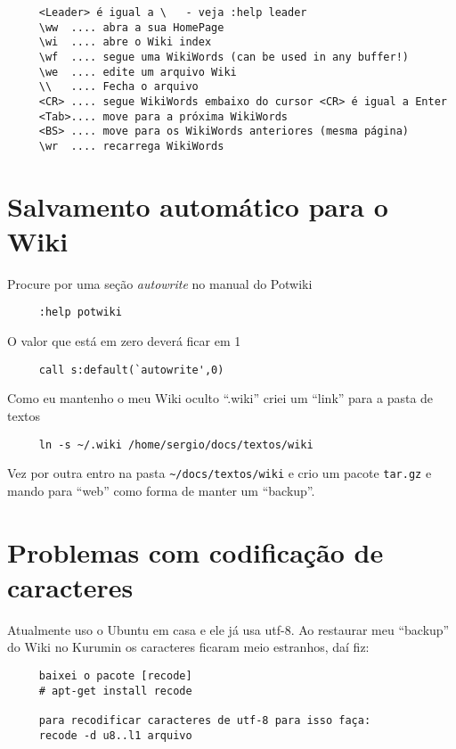 \begin{verbatim}
     <Leader> é igual a \   - veja :help leader
     \ww  .... abra a sua HomePage
     \wi  .... abre o Wiki index
     \wf  .... segue uma WikiWords (can be used in any buffer!)
     \we  .... edite um arquivo Wiki
     \\   .... Fecha o arquivo
     <CR> .... segue WikiWords embaixo do cursor <CR> é igual a Enter
     <Tab>.... move para a próxima WikiWords
     <BS> .... move para os WikiWords anteriores (mesma página)
     \wr  .... recarrega WikiWords
\end{verbatim}

\section{Salvamento automático para o Wiki }
\label{Salvamento automático para o Wiki }
Procure por uma seção {\em autowrite} no manual do Potwiki

\begin{verbatim}
     :help potwiki
\end{verbatim}

O valor que está em zero deverá ficar em 1

\begin{verbatim}
     call s:default(`autowrite',0)
\end{verbatim}

{\Large {}} Como eu mantenho o meu Wiki oculto ``.wiki'' criei um
``link'' para a pasta de textos

\begin{verbatim}
     ln -s ~/.wiki /home/sergio/docs/textos/wiki
\end{verbatim}

Vez por outra entro na pasta \verb|~/docs/textos/wiki| e crio um
pacote {\tt tar.gz} e mando para ``web'' como forma de manter um ``backup''.

\section{Problemas com codificação de caracteres}
\label{Problemas com codificação de caracteres}

Atualmente uso o Ubuntu em casa e ele já usa utf-8. Ao restaurar meu
``backup'' do Wiki no Kurumin os caracteres ficaram meio estranhos,
daí fiz:

\begin{verbatim}
     baixei o pacote [recode]
     # apt-get install recode
     
     para recodificar caracteres de utf-8 para isso faça:
     recode -d u8..l1 arquivo
\end{verbatim}
